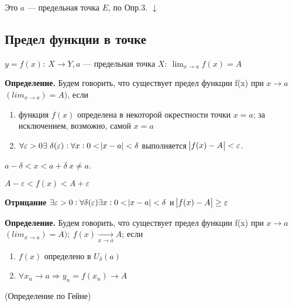 \documentclass{article}
\begin{document}
    Это \(a\) --- предельная точка \(E\), по Опр.3.
    \(\downarrow\)

    \subsection{Предел функции в точке}

    \(y=f(x):\ X \rightarrow Y, a\) --- предельная точка \(X:\ \lim_{x \rightarrow a}{f(x)} = A\)

    \textbf{Определение.} Будем говорить, что существует предел функции f(x) при \(x \rightarrow a\) \( (lim_{x\rightarrow a}) = A) \), если

    \begin{enumerate}
        \item функция \(f(x)\) определена в некоторой окрестности точки \(x=a\); за исключением, возможно, самой \(x=a\)
        \item \(\forall \varepsilon > 0 \exists\ \delta(\varepsilon): \forall x: 0 < \abs{x - a} < \delta\) выполняется \(\abs{f(x) - A} < \varepsilon\).
    \end{enumerate}
    \(a - \delta < x < a + \delta\ x \neq a\).

    \(A - \varepsilon < f(x) < A + \varepsilon\)

    \textbf{Отрицание} \(\exists \varepsilon > 0: \forall \delta(\varepsilon) \exists x: 0 < \abs{x - a} < \delta\) и \(\abs{f(x) - A} \geq \varepsilon\)

    \textbf{Определение.} Будем говорить, что существует предел функции f(x) при \(x \rightarrow a\) \( (lim_{x\rightarrow a}) = A);\ f(x) \xrightarrow[x \rightarrow a]{} A\); если

    \begin{enumerate}
      \item \(f(x)\) определено в \(U_\delta(a)\)
      \item \(\forall x_n \rightarrow a \Rightarrow y_n = f(x_n)\rightarrow A\)
    \end{enumerate}
    (Определение по Гейне)
\end{document}
